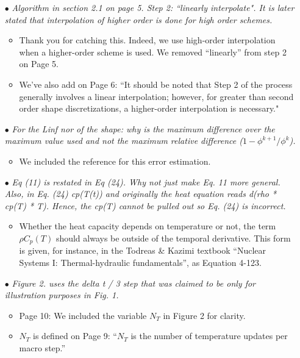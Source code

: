 \documentclass[11pt]{letter}
\newcommand{\nofix}{$\bullet$}
\newcommand{\done}{$\bullet$}
\newcommand{\easy}[1]{{\textit{#1}}}
\newcommand{\medm}[1]{{\textit{#1}}}
\begin{document}
\begin{itemize}
\item[\done] \easy{ Algorithm in section 2.1 on page 5. Step 2: ``linearly interpolate". It is later stated that interpolation of higher order is done for high order schemes. }
\begin{itemize}
\item Thank you for catching this. Indeed, we use high-order interpolation when a higher-order scheme is used. We removed ``linearly'' from step 2 on Page 5.
\item We've also add on Page 6: ``It should be noted that Step 2 of the process generally involves a linear interpolation; however, for greater than second order shape discretizations, a higher-order interpolation is necessary."
\end{itemize}

\item[\nofix] \easy{ For the Linf nor of the shape: why is the maximum difference over the maximum value used and not the maximum relative difference ($1 - \phi^{k+1}/\phi^k$). }
\begin{itemize}
\item We included the reference for this error estimation.
\end{itemize}

\item[\done] \medm{ Eq (11) is restated in Eq (24). Why not just make Eq. 11 more general. Also, in Eq. (24) cp(T(t)) and originally the heat equation reads d(rho * cp(T) * T). Hence, the cp(T) cannot be pulled out so Eq. (24) is incorrect. }
\begin{itemize}
\item Whether the heat capacity depends on temperature or not, the term  $\rho C_p(T)$ should always be outside of the temporal derivative. This form is given, for instance, in the Todreas \& Kazimi textbook ``Nuclear Systems I: Thermal-hydraulic fundamentals'', as Equation 4-123.
\end{itemize}

\item[\done] \easy{ Figure 2. uses the delta t / 3 step that was claimed to be only for illustration purposes in Fig. 1. }
\begin{itemize}
\item Page 10: We included the variable $N_{T}$ in Figure 2 for clarity.
\item $N_T$ is defined on Page 9: ``$N_T$ is the number of temperature updates per macro step.''
\end{itemize}


\end{itemize}
\end{document}
